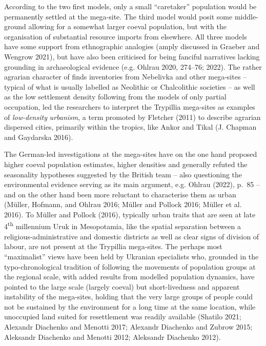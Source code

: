\documentclass[
  12pt,
  a4paper, twoside]{book}
\begin{document}
According to the two first models, only a small ``caretaker'' population would be permanently settled at the mega-site. The third model would posit some middle-ground allowing for a somewhat larger coeval population, but with the organisation of substantial resource imports from elsewhere. All three models have some support from ethnographic analogies (amply discussed in Graeber and Wengrow 2021), but have also been criticised for being fanciful narratives lacking grounding in archaeological evidence (e.g. Ohlrau 2020, 274--76; 2022). The rather agrarian character of finds inventories from Nebelivka and other mega-sites -- typical of what is usually labelled as Neolithic or Chalcolithic societies -- as well as the low settlement density following from the models of only partial occupation, led the researchers to interpret the Trypillia mega-sites as examples of \emph{low-density} \emph{urbanism}, a term promoted by Fletcher (2011) to describe agrarian dispersed cities, primarily within the tropics, like Ankor and Tikal (J. Chapman and Gaydarska 2016).

The German-led investigations at the mega-sites have on the one hand proposed higher coeval population estimates, higher densities and generally refuted the seasonality hypotheses suggested by the British team -- also questioning the environmental evidence serving as its main argument, e.g. Ohlrau (2022), p.~85 -- and on the other hand been more reluctant to characterise them as urban (Müller, Hofmann, and Ohlrau 2016; Müller and Pollock 2016; Müller et al. 2016). To Müller and Pollock (2016), typically urban traits that are seen at late 4\textsuperscript{th} millennium Uruk in Mesopotamia, like the spatial separation between a religious-administrative and domestic districts as well as clear signs of division of labour, are not present at the Trypillia mega-sites. The perhaps most ``maximalist'' views have been held by Ukranian specialists who, grounded in the typo-chronological tradition of following the movements of population groups at the regional scale, with added results from modelled population dynamics, have pointed to the large scale (largely coeval) but short-livedness and apparent instability of the mega-sites, holding that the very large groups of people could not be sustained by the environment for a long time at the same location, while unoccupied land suited for resettlement was readily available (Shatilo 2021; Alexandr Diachenko and Menotti 2017; Alexandr Diachenko and Zubrow 2015; Aleksandr Diachenko and Menotti 2012; Aleksandr Diachenko 2012).
\end{document}
